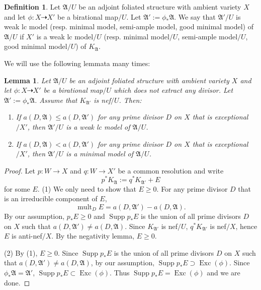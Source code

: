 \documentclass[12pt]{amsart}
\numberwithin{equation}{section}
\newcommand{\Exc}{\operatorname{Exc}}
\newcommand{\Supp}{\operatorname{Supp}}
\newcommand{\mult}{\operatorname{mult}}
\newcommand{\Aa}{{\mathfrak{A}}}
\newtheorem{lem}[thm]{Lemma}
\theoremstyle{definition}
\newtheorem{defn}[thm]{Definition}
\theoremstyle{definition}
\theoremstyle{definition}
\begin{document}
\begin{defn}\label{defn: minimal model}
Let $\Aa/U$ be an adjoint foliated structure with ambient variety $X$ and let $\phi: X\dashrightarrow X'$ be a birational map$/U$. Let $\Aa':=\phi_*\Aa$. We say that $\Aa'/U$ is weak lc model (resp. minimal model, semi-ample model, good minimal model) of $\Aa/U$ if $X'$ is a weak lc model$/U$ (resp. minimal model$/U$, semi-ample model$/U$, good minimal model$/U$) of $K_{\Aa}$.
\end{defn}

We will use the following lemmata many times:

\begin{lem}\label{lem: weak lc model only check codim 1}
 Let $\Aa/U$ be an adjoint foliated structure with ambient variety $X$ and let $\phi: X\dashrightarrow X'$ be a birational map$/U$ which does not extract any divisor. Let $\Aa':=\phi_*\Aa$. Assume that $K_{\Aa'}$ is nef$/U$. Then:
 \begin{enumerate}
     \item If $a(D,\Aa)\leq a(D,\Aa')$ for any prime divisor $D$ on $X$ that is exceptional$/X'$, then $\Aa'/U$ is a weak lc model of $\Aa/U$.
     \item If $a(D,\Aa)<a(D,\Aa')$ for any prime divisor $D$ on $X$ that is exceptional$/X'$, then $\Aa'/U$ is a minimal model of $\Aa/U$.
 \end{enumerate}
\end{lem}
\begin{proof}
Let $p: W\rightarrow X$ and $q: W\rightarrow X'$ be a common resolution and write
$$p^*K_{\Aa}:=q^*K_{\Aa'}+E$$
for some $E$.
(1) We only need to show that $E\geq 0$. For any prime divisor $D$ that is an irreducible component of $E$, $$\mult_DE=a(D,\Aa')-a(D,\Aa).$$ 
By our assumption, $p_*E\geq 0$ and
$\Supp p_*E$ is the union of all prime divisors $D$ on $X$ such that $a(D,\Aa')\not=a(D,\Aa)$. Since $K_{\Aa'}$ is nef$/U$, $q^*K_{\Aa'}$ is nef$/X$, hence $E$ is anti-nef$/X$. By the negativity lemma, $E\geq 0$.

(2) By (1), $E\geq 0$. Since $\Supp p_*E$ is the union of all prime divisors $D$ on $X$ such that $a(D,\Aa')\not=a(D,\Aa)$, by our assumption, $\Supp p_*E\supset\Exc(\phi)$. Since $\phi_*\Aa=\Aa'$, $\Supp p_*E\subset\Exc(\phi)$. Thus $\Supp p_*E=\Exc(\phi)$ and we are done.
\end{proof}
\end{document}
